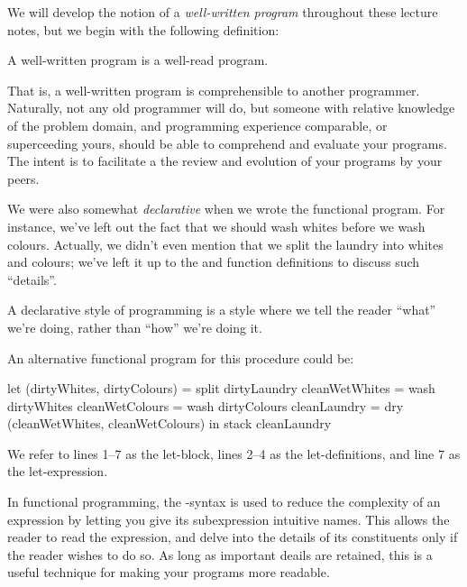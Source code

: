 We will develop the notion of a \emph{well-written program} throughout these
lecture notes, but we begin with the following definition:

\begin{definition}

A well-written program is a well-read program.

\end{definition}

That is, a well-written program is comprehensible to another programmer.
Naturally, not any old programmer will do, but someone with relative knowledge
of the problem domain, and programming experience comparable, or superceeding
yours, should be able to comprehend and evaluate your programs. The intent is
to facilitate a the review and evolution of your programs by your peers.

We were also somewhat \emph{declarative} when we wrote the functional program.
For instance, we've left out the fact that we should wash whites before we wash
colours. Actually, we didn't even mention that we split the laundry into whites
and colours; we've left it up to the  and  function
definitions to discuss such ``details''.

\begin{definition}

A declarative style of programming is a style where we tell the reader ``what''
we're doing, rather than ``how'' we're doing it.

\end{definition}

An alternative functional program for this procedure could be:

\begin{code}
let
  (dirtyWhites, dirtyColours) = split dirtyLaundry
  cleanWetWhites = wash dirtyWhites
  cleanWetColours = wash dirtyColours
  cleanLaundry = dry (cleanWetWhites, cleanWetColours)
in
  stack cleanLaundry
\end{code}

\begin{definition}

We refer to lines 1--7 as the let-block, lines 2--4 as the let-definitions, and
line 7 as the let-expression.

\end{definition}

In functional programming, the -syntax is used to reduce the
complexity of an expression by letting you give its subexpression intuitive
names. This allows the reader to read the expression, and delve into the
details of its constituents only if the reader wishes to do so. As long as
important deails are retained, this is a useful technique for making your
programs more readable.

